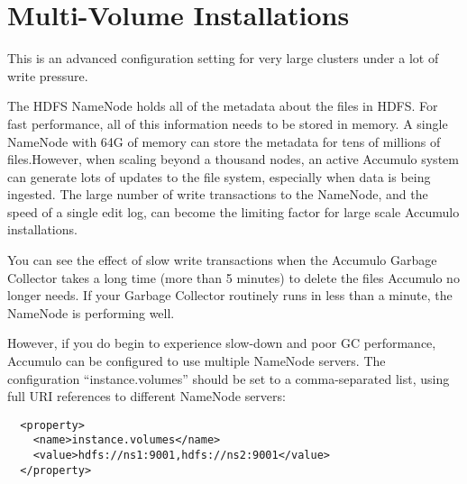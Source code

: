 
%
%

\chapter{Multi-Volume Installations}

This is an advanced configuration setting for very large clusters
under a lot of write pressure.

The HDFS NameNode holds all of the metadata about the files in
HDFS. For fast performance, all of this information needs to be stored
in memory.  A single NameNode with 64G of memory can store the
metadata for tens of millions of files.However, when scaling beyond a
thousand nodes, an active Accumulo system can generate lots of updates
to the file system, especially when data is being ingested.  The large
number of write transactions to the NameNode, and the speed of a
single edit log, can become the limiting factor for large scale
Accumulo installations.

You can see the effect of slow write transactions when the Accumulo
Garbage Collector takes a long time (more than 5 minutes) to delete
the files Accumulo no longer needs.  If your Garbage Collector
routinely runs in less than a minute, the NameNode is performing well.

However, if you do begin to experience slow-down and poor GC
performance, Accumulo can be configured to use multiple NameNode
servers.  The configuration ``instance.volumes'' should be set to a
comma-separated list, using full URI references to different NameNode
servers:

\begingroup\fontsize{8pt}{8pt}\selectfont\begin{verbatim}
  <property>
    <name>instance.volumes</name>
    <value>hdfs://ns1:9001,hdfs://ns2:9001</value>
  </property>
\end{verbatim}\endgroup

